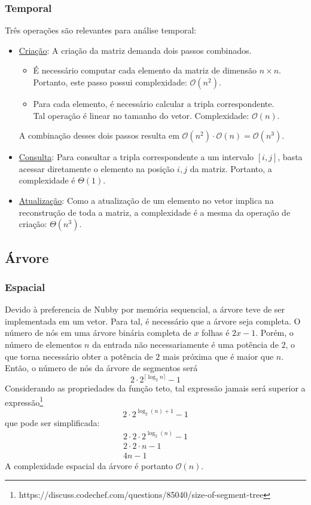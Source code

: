\documentclass{article}
\begin{document}
\subsubsection{Temporal}
Três operações são relevantes para análise temporal:
\vspace{-5pt}
\begin{itemize}
  \item \uline{Criação}: A criação da matriz demanda dois passos combinados.
        \begin{itemize}
          \item É necessário computar cada elemento da matriz de dimensão $n \times n$.\\
                Portanto, este passo possui complexidade: $\mathcal{O}(n^2)$.
          \item Para cada elemento, é necessário calcular a tripla correspondente. \\
                Tal operação é linear no tamanho do vetor. Complexidade: $\mathcal{O}(n)$.
        \end{itemize}
        A combinação desses dois passos resulta em $\mathcal{O}(n^2) \cdot \mathcal{O}(n) = \mathcal{O}(n^3)$.
  
  \item \uline{Consulta}: Para consultar a tripla correspondente a um intervalo $[i, j]$, basta acessar diretamente o elemento na posição $i, j$ da matriz. Portanto, a complexidade é $\Theta(1)$.
  
  \item \uline{Atualização}: Como a atualização de um elemento no vetor implica na reconstrução de toda a matriz, a complexidade é a mesma da operação de criação: $\Theta(n^3)$.
\end{itemize}


\subsection{Árvore}

\subsubsection{Espacial}
Devido à preferencia de Nubby por memória sequencial, a árvore teve de ser implementada em um vetor. Para tal, é necessário que a árvore seja completa. O número de nós em uma árvore binária completa de $x$ folhas é $2x - 1$. Porém, o número de elementos $n$ da entrada não necessariamente é uma potência de $2$, o que torna necessário obter a potência de $2$ mais próxima que é maior que $n$. Então, o número de nós da árvore de segmentos será 
\[ 2 \cdot 2^{\lceil \log_2 n \rceil} - 1 \]
Considerando as propriedades da função teto, tal expressão jamais será superior a expressão\footnote{\label{link1}https://discuss.codechef.com/questions/85040/size-of-segment-tree} \\
\[ 2 \cdot 2^{\log_2(n) + 1} - 1 \]
que pode ser simplificada:
\begin{gather*}
  2 \cdot 2 \cdot 2^{\log_2(n)} - 1 \\
  2 \cdot 2 \cdot n - 1 \\
  4n - 1
\end{gather*}
A complexidade espacial da árvore é portanto $\mathcal{O}(n)$.
\end{document}
